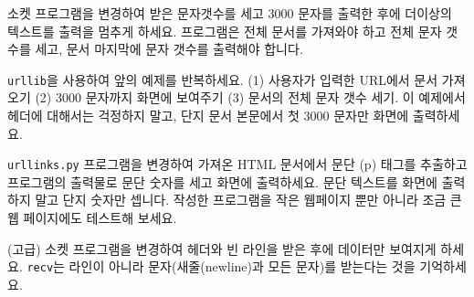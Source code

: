 \begin{ex}
소켓 프로그램을 변경하여 받은 문자갯수를 세고 3000 문자를 출력한 후에 더이상의 텍스트를 출력을 멈추게 하세요.
프로그램은 전체 문서를 가져와야 하고 전체 문자 갯수를 세고, 문서 마지막에 문자 갯수를 출력해야 합니다.
\end{ex}

\begin{ex}
{\tt urllib}을 사용하여 앞의 예제를 반복하세요. (1) 사용자가 입력한 URL에서 문서 가져오기
(2) 3000 문자까지 화면에 보여주기 (3) 문서의 전체 문자 갯수 세기.
이 예제에서 헤더에 대해서는 걱정하지 말고, 단지 문서 본문에서 첫 3000 문자만 화면에 출력하세요.
\end{ex}

\begin{ex} {\tt urllinks.py} 프로그램을 변경하여 가져온 HTML 문서에서 문단 (p) 태그를 추출하고
프로그램의 출력물로 문단 숫자를 세고 화면에 출력하세요. 문단 텍스트를 화면에 출력하지 말고 단지 숫자만 셉니다.
작성한 프로그램을 작은 웹페이지 뿐만 아니라 조금 큰 웹 페이지에도 테스트해 보세요.
\end{ex}

\begin{ex}
(고급) 소켓 프로그램을 변경하여 헤더와 빈 라인을 받은 후에 데이터만 보여지게 하세요.
{\tt recv}는 라인이 아니라 문자(새줄(newline)과 모든 문자)를 받는다는 것을 기억하세요.
\end{ex}


